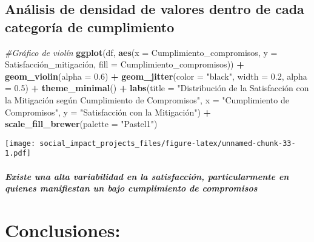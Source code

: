 \documentclass[
]{article}
\newenvironment{Shaded}{\begin{snugshade}}{\end{snugshade}}
\newcommand{\AttributeTok}[1]{\textcolor[rgb]{0.13,0.29,0.53}{#1}}
\newcommand{\CommentTok}[1]{\textcolor[rgb]{0.56,0.35,0.01}{\textit{#1}}}
\newcommand{\FloatTok}[1]{\textcolor[rgb]{0.00,0.00,0.81}{#1}}
\newcommand{\FunctionTok}[1]{\textcolor[rgb]{0.13,0.29,0.53}{\textbf{#1}}}
\newcommand{\NormalTok}[1]{#1}
\newcommand{\SpecialCharTok}[1]{\textcolor[rgb]{0.81,0.36,0.00}{\textbf{#1}}}
\newcommand{\StringTok}[1]{\textcolor[rgb]{0.31,0.60,0.02}{#1}}
\begin{document}
\subsection{\texorpdfstring{\textbf{Análisis de densidad de valores
dentro de cada categoría de
cumplimiento}}{Análisis de densidad de valores dentro de cada categoría de cumplimiento}}\label{anuxe1lisis-de-densidad-de-valores-dentro-de-cada-categoruxeda-de-cumplimiento}

\begin{Shaded}
\begin{Highlighting}[]
\CommentTok{\#Gráfico de violín}
\FunctionTok{ggplot}\NormalTok{(df, }\FunctionTok{aes}\NormalTok{(}\AttributeTok{x =}\NormalTok{ Cumplimiento\_compromisos, }\AttributeTok{y =}\NormalTok{ Satisfacción\_mitigación, }\AttributeTok{fill =}\NormalTok{ Cumplimiento\_compromisos)) }\SpecialCharTok{+}
  \FunctionTok{geom\_violin}\NormalTok{(}\AttributeTok{alpha =} \FloatTok{0.6}\NormalTok{) }\SpecialCharTok{+}
  \FunctionTok{geom\_jitter}\NormalTok{(}\AttributeTok{color =} \StringTok{"black"}\NormalTok{, }\AttributeTok{width =} \FloatTok{0.2}\NormalTok{, }\AttributeTok{alpha =} \FloatTok{0.5}\NormalTok{) }\SpecialCharTok{+}
  \FunctionTok{theme\_minimal}\NormalTok{() }\SpecialCharTok{+}
  \FunctionTok{labs}\NormalTok{(}\AttributeTok{title =} \StringTok{"Distribución de la Satisfacción con la Mitigación según Cumplimiento de Compromisos"}\NormalTok{,}
       \AttributeTok{x =} \StringTok{"Cumplimiento de Compromisos"}\NormalTok{,}
       \AttributeTok{y =} \StringTok{"Satisfacción con la Mitigación"}\NormalTok{) }\SpecialCharTok{+}
  \FunctionTok{scale\_fill\_brewer}\NormalTok{(}\AttributeTok{palette =} \StringTok{"Pastel1"}\NormalTok{)}
\end{Highlighting}
\end{Shaded}

\texttt{[image: social\_impact\_projects\_files/figure-latex/unnamed-chunk-33-1.pdf]}

\subparagraph{\texorpdfstring{\emph{Existe una alta variabilidad en la
satisfacción, particularmente en quienes manifiestan un bajo
cumplimiento de
compromisos}}{Existe una alta variabilidad en la satisfacción, particularmente en quienes manifiestan un bajo cumplimiento de compromisos}}\label{existe-una-alta-variabilidad-en-la-satisfacciuxf3n-particularmente-en-quienes-manifiestan-un-bajo-cumplimiento-de-compromisos}

\section{\texorpdfstring{\textbf{Conclusiones:}}{Conclusiones:}}\label{conclusiones}
\end{document}
